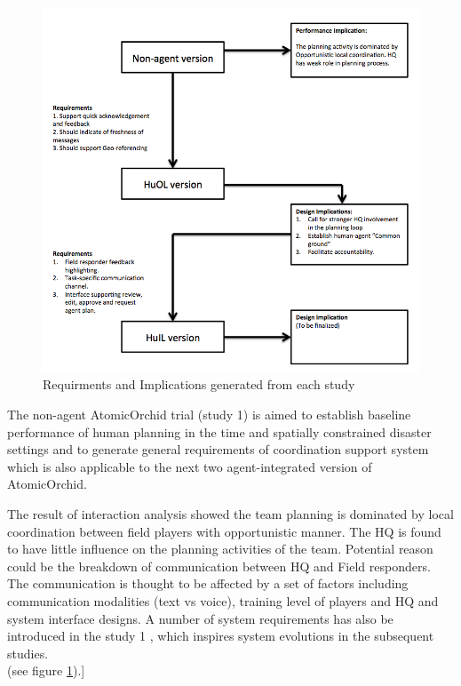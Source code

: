 \begin{figure}[h]
  \centering
  \includegraphics[width=1\textwidth]{img/conclusion/connections}
  \caption{Requirments and Implications generated from each study}
  \label{fig:connections}
\end{figure}

The non-agent AtomicOrchid trial (study 1) is aimed to establish baseline performance of human planning in the time and spatially constrained disaster settings and to generate general requirements of coordination support system which is also applicable to the next two agent-integrated version of AtomicOrchid. 

The result of interaction analysis showed the team planning is dominated by local coordination between field players with opportunistic manner. The HQ is found to have little influence on the planning activities of the team. Potential reason could be the breakdown of communication between HQ and Field responders. The communication is thought to be affected by a set of factors including communication modalities (text vs voice), training level of players and HQ and system interface designs. A number of system requirements has also be introduced in the study 1 , which inspires system evolutions in the subsequent studies. \\

(see figure \ref{fig:connections}).]\\

